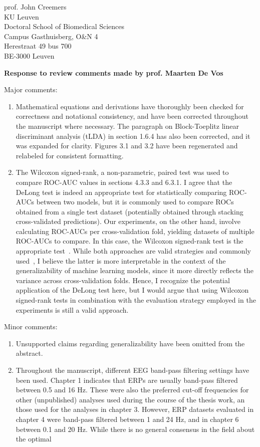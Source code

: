 \documentclass{letter}
\newcommand{\reply}[1]{%
	\textbf{Response to review comments made by prof. #1}

}
\begin{document}
\begin{letter}{%
	prof. John Creemers \\
	KU Leuven \\
	Doctoral School of Biomedical Sciences \\
	Campus Gasthuisberg, O\&N 4 \\
	Herestraat 49 bus 700 \\
	BE-3000 Leuven

}
\reply{Maarten De Vos}
Major comments:
\begin{enumerate}
	\item Mathematical equations and derivations have thoroughly
	been checked for correctness and notational consistency, and have been
	corrected throughout the manuscript where necessary.
	The paragraph on Block-Toeplitz linear discriminant analysis (tLDA) in
	section 1.6.4 has also been corrected, and it was expanded for clarity.
	Figures 3.1 and 3.2 have been regenerated and relabeled for consistent
	formatting.
	\item The Wilcoxon signed-rank, a non-parametric,
    paired test was used to compare ROC-AUC values in sections 4.3.3 and 6.3.1.
    I agree that the DeLong test is indeed an appropriate test for
    statistically comparing ROC-AUCs between two models, but it is commonly used
    to compare ROCs obtained from a single test dataset (potentially obtained
    through stacking cross-validated predictions).
    Our experiments, on the other hand, involve calculating ROC-AUCs per
    cross-validation fold, yielding datasets of multiple ROC-AUCs to compare.
    In this case, the Wilcoxon signed-rank test is the appropriate
    test~\cite{Rainio2024}.
    While both approaches are valid strategies and commonly used~\cite{Rainio2024}, I believe
    the latter is more interpretable in the context of the generalizability
    of machine learning models, since it more directly reflects the variance
    across cross-validation folds.
    Hence, I recognize the potential application of the DeLong test here,
    but I would argue that using Wilcoxon signed-rank tests in combination with
    the evaluation strategy employed in the experiments is still a valid approach.
   \end{enumerate}
Minor comments:
\begin{enumerate}
	\item Unsupported claims regarding generalizability have been omitted
	from the abstract.
	\item Throughout the manuscript, different EEG band-pass filtering
	settings have been used.
	Chapter 1 indicates that ERPs are usually band-pass filtered between
	0.5 and 16 Hz.
	These were also the preferred cut-off frequencies for other
	(unpublished) analyses used during the course of the thesis work, an
	those used for the analyses in chapter 3.
	However, ERP datasets evaluated in chapter 4 were band-pass filtered
	between 1 and 24 Hz, and in chapter 6 between 0.1 and 20 Hz.
	While there is no general consensus in the field about the optimal

\end{enumerate}
\end{letter}
\end{document}
